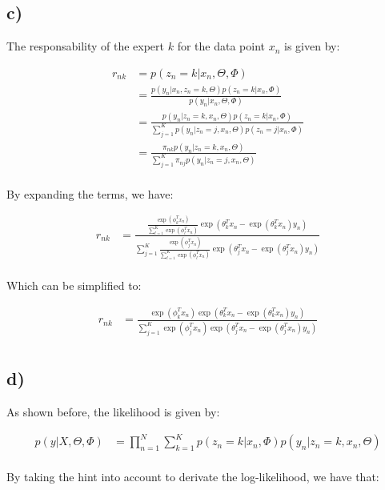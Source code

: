 \documentclass[12pt,a4paper,oneside]{paper}
\begin{document}
\subsection*{c)}

The responsability of the expert $k$ for the data point $x_n$ is given by:

\begin{align*}
    r_{nk} &= p(z_n = k | x_n, \Theta, \Phi) \\
    &= \frac{p(y_n | x_n, z_n = k, \Theta) p(z_n = k | x_n, \Phi)}{p(y_n | x_n, \Theta, \Phi)} \\
    &= \frac{p(y_n | z_n = k, x_n, \Theta) p(z_n = k | x_n, \Phi)}{\sum_{j=1}^{K} p(y_n | z_n = j, x_n, \Theta) p(z_n = j | x_n, \Phi)} \\
    &= \frac{\pi_{nk} p(y_n | z_n = k, x_n, \Theta)}{\sum_{j=1}^{K} \pi_{nj} p(y_n | z_n = j, x_n, \Theta)} \\
\end{align*}

By expanding the terms, we have:

\begin{align*}
    r_{nk} &= \frac{\frac{\exp(\phi_k^T x_n)}{\sum_{l=1}^{K} \exp(\phi_l^T x_n)} \exp(\theta_k^T x_n -\exp(\theta_k^T x_n) y_n)}{\sum_{j=1}^{K} \frac{\exp(\phi_j^T x_n)}{\sum_{l=1}^{K} \exp(\phi_l^T x_n)} \exp(\theta_j^T x_n -\exp(\theta_j^T x_n) y_n)} \\
\end{align*}

Which can be simplified to:

\begin{align*}
    r_{nk} &= \frac{\exp(\phi_k^T x_n) \exp(\theta_k^T x_n -\exp(\theta_k^T x_n) y_n)}{\sum_{j=1}^{K} \exp(\phi_j^T x_n) \exp(\theta_j^T x_n -\exp(\theta_j^T x_n) y_n)} \\
\end{align*}

\subsection*{d)}

As shown before, the likelihood is given by:

\begin{align*}
    p(y | X, \Theta, \Phi) &= \prod_{n=1}^{N} \sum_{k=1}^{K} p(z_n = k | x_n, \Phi) p(y_n | z_n = k, x_n, \Theta) \\
\end{align*}

By taking the hint into account to derivate the log-likelihood, we have that:
\end{document}
